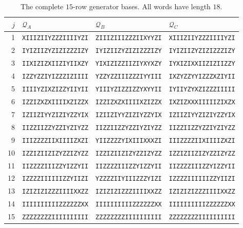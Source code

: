 \documentclass[11pt,a4paper]{article}
\newcommand{\CA}{\mathcal Q_A}
\newcommand{\CB}{\mathcal Q_B}
\newcommand{\CC}{\mathcal Q_C}
\begin{document}
\begin{table}[htbp]
\centering\small
\setlength{\tabcolsep}{6pt}
\begin{tabular}{@{}rlll@{}}\toprule
$j$&$\CA$&$\CB$&$\CC$\\\midrule
1 & \texttt{XIIIZIIYZZZIIIIYZI} & \texttt{ZIIIZIIIZZZIIXYYZI} & \texttt{XIIIZIIYZZZIIIIYZI} \\
2 & \texttt{IYIZIIZYZIZIZZZIZY} & \texttt{IYIZIIZYZIZIZZZIZY} & \texttt{IYIZIIZYZIZIZZZIZY} \\
3 & \texttt{IIXIZIZXIIZIYIIXZY} & \texttt{YIXIZIZZIIZIYXYXZY} & \texttt{IYXIZIXXIIZIZIIZZY} \\
4 & \texttt{IZZYZZIYIZZZIZIIII} & \texttt{YZZYZZIIIZZZIYYIII} & \texttt{IXZYZZYYIZZZXZIYII} \\
5 & \texttt{IIIIYZIXZIZZYIIYII} & \texttt{YIIIYZIZZIZZYXYYII} & \texttt{IYIIYZYXZIZZZIIIII} \\
6 & \texttt{IZZIZXZXIIIIXZIZZX} & \texttt{IZZIZXZXIIIIXZIZZX} & \texttt{IXZIZXXXIIIIIZIXZX} \\
7 & \texttt{IZIIZIYYZIZIYZZYIX} & \texttt{IZIIZIYYZIZIYZZYIX} & \texttt{IZIIZIYYZIZIYZZYIX} \\
8 & \texttt{IIZZIIZZYZZIYZIYZZ} & \texttt{IIZZIIZZYZZIYZIYZZ} & \texttt{IIZZIIZZYZZIYZIYZZ} \\
9 & \texttt{IIIZZZZIIXIIIIZXZI} & \texttt{YIIZZZZYIXIIIXXXZI} & \texttt{IIIZZZZIIXIIIIZXZI} \\
10 & \texttt{IZZIZIIZIZYZZIZYZZ} & \texttt{IZZIZIIZIZYZZIZYZZ} & \texttt{IZZIZIIZIZYZZIZYZZ} \\
11 & \texttt{IIZZZZIIIZZYIZZYII} & \texttt{IIZZZZIIIZZYIZZYII} & \texttt{IIZZZZIIIZZYIZZYII} \\
12 & \texttt{IZZZZIIIIIIZZYIIZI} & \texttt{YZZZZIIYIIIZZZYIZI} & \texttt{IZZZZIIIIIIZZYIIZI} \\
13 & \texttt{IZIZIZIZZZIIIIXXZZ} & \texttt{IZIZIZIZZZIIIIXXZZ} & \texttt{IZIZIZIZZZIIIIXXZZ} \\
14 & \texttt{IIIIIIIIIIZZZZZZXX} & \texttt{IIIIIIIIIIZZZZZZXX} & \texttt{IIIIIIIIIIZZZZZZXX} \\
15 & \texttt{ZZZZZZZZIIIIIIIIII} & \texttt{ZZZZZZZZIIIIIIIIII} & \texttt{ZZZZZZZZIIIIIIIIII} \\
\bottomrule
\end{tabular}
\caption{The complete $15$-row generator bases. All words have length $18$.}\label{tab:generators}
\end{table}
\end{document}
